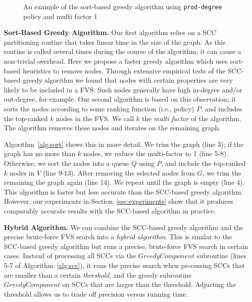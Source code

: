 \begin{figure}[t]
\begin{minipage}[b]{0.19\linewidth}
   		\end{minipage}
  	\vspace{-1em}             
   \caption{An example of the sort-based greedy algorithm using \texttt{prod-degree} policy and multi factor 1}
   \label{fig:simple}               
   \vspace{-1em}    	
\end{figure}

{\bf Sort-Based Greedy Algorithm.} Our first algorithm relies on a SCC partitioning routine that takes linear time in the size of the graph. As this routine is called several times during the course of the algorithm, it can cause a non-trivial overhead. Here we propose a faster greedy algorithm which uses sort-based heuristics to remove nodes. Through extensive empirical tests of the SCC-based greedy algorithm we found that nodes with certain properties are very likely to be included in a FVS. Such nodes generally have high in-degree and/or out-degree, for example. Our second algorithm is based on this observation; it sorts the nodes according to some ranking function (i.e., policy) $P$, and includes the top-ranked $k$ nodes in the FVS. We call $k$ the \emph{multi factor} of the algorithm. The algorithm removes these nodes and iterates on the remaining graph.

Algorithm~\ref{alg:sort} shows this in more detail. We trim the graph (line 3); if the graph has no more than $k$ nodes, we reduce the multi-factor to 1 (line 5-8). Otherwise, we sort the nodes into a queue $Q$ using $P$, and include the top-ranked $k$ nodes in $V$ (line 9-13).
After removing the selected nodes from $G$, we trim the remaining the graph again (line 14). We repeat until the graph is empty (line 4). This algorithm is faster but less accurate than the SCC-based greedy algorithm. However,  our experiments in Section~\ref{sec:experiments} show that it produces comparably accurate results with the SCC-based algorithm in practice.

{\bf Hybrid Algorithm.}
We can combine the SCC-based greedy algorithm and the precise brute-force FVS search into a \emph{hybrid algorithm}. This is similar to the SCC-based greedy algorithm but runs a precise, brute-force FVS search in certain cases. Instead of processing all SCCs via the $GreedyComponent$ subroutine (lines 5-7 of Algorithm~\ref{alg:scc}), it runs the precise search when processing SCCs that are smaller than a certain \emph{threshold}, and the greedy subroutine $GreedyComponent$ on SCCs that are larger than the threshold. Adjusting the threshold allows us to trade off precision versus running time.


